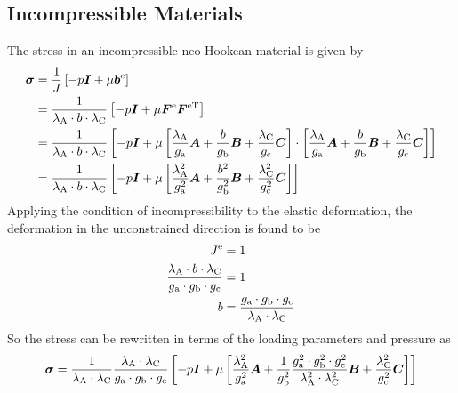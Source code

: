 \documentclass[10pt,letterpaper,oneside]{report}
\newcommand{\ten}[1]{\mbox{\boldmath $#1$}{}}
\newcommand{\scas}[1]{\mbox{{\scriptsize{${\rm{#1}}$}}}{}}
\begin{document}
\begin{itemize}
\subsection{Incompressible Materials}
The stress in an incompressible neo-Hookean material is given by
\begin{align}
\ten{\sigma} &= \frac{1}{J} \left[ - p \ten{I} + \mu \ten{b}^{\scas{e}} \right] \\
&= \frac{1}{\lambda_{\scas{A}} \cdot b \cdot \lambda_{\scas{C}}} \left[ - p \ten{I} + \mu \ten{F}^{\scas{e}} \ten{F}^{\scas{eT}} \right] \\
&= \frac{1}{\lambda_{\scas{A}} \cdot b \cdot \lambda_{\scas{C}}} \left[ - p \ten{I} + \mu \left[ \frac{\lambda_{\scas{A}} }{g_{\scas{a}}} \ten{A} + \frac{b}{g_{\scas{b}}} \ten{B} + \frac{\lambda_{\scas{C}} }{g_{\scas{c}}} \ten{C} \right] \cdot \left[ \frac{\lambda_{\scas{A}} }{g_{\scas{a}}} \ten{A} + \frac{b}{g_{\scas{b}}} \ten{B} + \frac{\lambda_{\scas{C}} }{g_{\scas{c}}} \ten{C} \right] \right] \\
&= \frac{1}{\lambda_{\scas{A}} \cdot b \cdot \lambda_{\scas{C}}} \left[ - p \ten{I} + \mu \left[ \frac{\lambda_{\scas{A}}^2}{g_{\scas{a}}^2} \ten{A} + \frac{b^2}{g_{\scas{b}}^2} \ten{B} + \frac{\lambda_{\scas{C}}^2}{g_{\scas{c}}^2} \ten{C} \right] \right] 
\end{align}
Applying the condition of incompressibility to the elastic deformation, the deformation in the unconstrained direction is found to be
\begin{align}
J^{\scas{e}} &= 1 \\ 
\frac{\lambda_{\scas{A}} \cdot b \cdot \lambda_{\scas{C}} }{g_{\scas{a}} \cdot g_{\scas{b}} \cdot g_{\scas{c}}} &= 1 \\
b &= \frac{g_{\scas{a}} \cdot g_{\scas{b}} \cdot g_{\scas{c}}}{\lambda_{\scas{A}} \cdot \lambda_{\scas{C}} } 
\end{align}
So the stress can be rewritten in terms of the loading parameters and pressure as
\begin{align}
\ten{\sigma} &= \frac{1}{\lambda_{\scas{A}} \cdot \lambda_{\scas{C}}} \frac{\lambda_{\scas{A}} \cdot \lambda_{\scas{C}} }{g_{\scas{a}} \cdot g_{\scas{b}} \cdot g_{\scas{c}}} \left[ - p \ten{I} + \mu \left[ \frac{\lambda_{\scas{A}}^2}{g_{\scas{a}}^2} \ten{A} + \frac{1}{g_{\scas{b}}^2} \frac{g_{\scas{a}}^2 \cdot g_{\scas{b}}^2 \cdot g_{\scas{c}}^2}{\lambda_{\scas{A}}^2 \cdot \lambda_{\scas{C}}^2 } \ten{B} + \frac{\lambda_{\scas{C}}^2}{g_{\scas{c}}^2} \ten{C} \right] \right] \\

\end{align}
\end{itemize}
\end{document}
